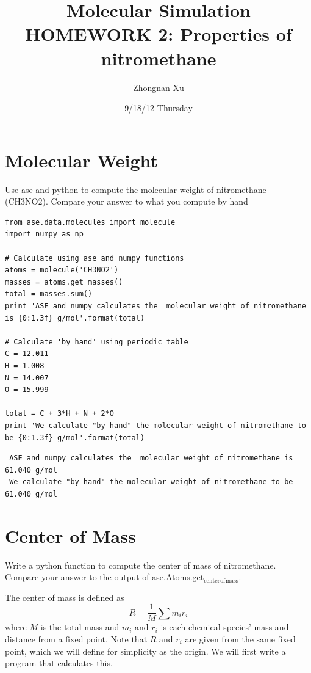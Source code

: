 \documentclass[11pt]{article}
\title{Molecular Simulation HOMEWORK 2: Properties of nitromethane}
\author{Zhongnan Xu}
\date{9/18/12 Thursday}
\begin{document}
\maketitle

\setcounter{tocdepth}{3}
\tableofcontents
\vspace*{1cm}

\section{Molecular Weight}
\label{sec-1}

Use ase and python to compute the molecular weight of nitromethane (CH3NO2).
Compare your answer to what you compute by hand


\begin{verbatim}
from ase.data.molecules import molecule
import numpy as np

# Calculate using ase and numpy functions
atoms = molecule('CH3NO2')
masses = atoms.get_masses()
total = masses.sum()
print 'ASE and numpy calculates the  molecular weight of nitromethane is {0:1.3f} g/mol'.format(total) 

# Calculate 'by hand' using periodic table
C = 12.011
H = 1.008
N = 14.007
O = 15.999

total = C + 3*H + N + 2*O
print 'We calculate "by hand" the molecular weight of nitromethane to be {0:1.3f} g/mol'.format(total)
\end{verbatim}

\begin{verbatim}
 ASE and numpy calculates the  molecular weight of nitromethane is 61.040 g/mol
 We calculate "by hand" the molecular weight of nitromethane to be 61.040 g/mol
\end{verbatim}
\section{Center of Mass}
\label{sec-2}

Write a python function to compute the center of mass of
nitromethane. Compare your answer to the output of
ase.Atoms.get$_{\mathrm{center}}$$_{\mathrm{of}}$$_{\mathrm{mass}}$.

The center of mass is defined as 
\begin{equation}
R = \frac{1}{M} \sum m_ir_i
\end{equation}
where $M$ is the total mass and $m_i$ and $r_i$ is each chemical species' mass
and distance from a fixed point. Note that $R$ and $r_i$ are given from the same
fixed point, which we will define for simplicity as the origin. We will first write
a program that calculates this.
\end{document}
